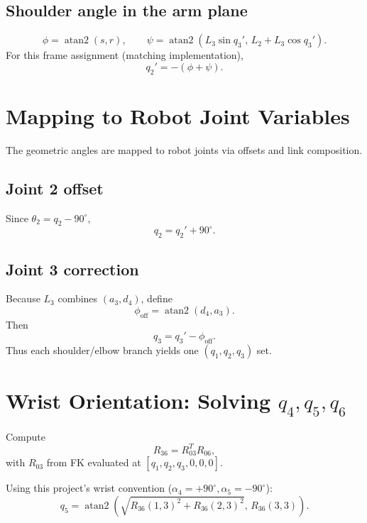 \documentclass[11pt]{article}
\begin{document}
\subsection*{Shoulder angle in the arm plane}
\begin{equation}
    \phi = \operatorname{atan2}(s,r),
    \qquad
    \psi = \operatorname{atan2}(L_3\sin q_3',\,L_2+L_3\cos q_3').
\end{equation}
For this frame assignment (matching implementation),
\begin{equation}
    q_2' = -(\phi+\psi).
\end{equation}

\section{Mapping to Robot Joint Variables}
The geometric angles are mapped to robot joints via offsets and link composition.

\subsection*{Joint 2 offset}
Since $\theta_2=q_2-90^\circ$,
\begin{equation}
    q_2 = q_2' + 90^\circ.
\end{equation}

\subsection*{Joint 3 correction}
Because $L_3$ combines $(a_3,d_4)$, define
\begin{equation}
    \phi_{\mathrm{off}}=\operatorname{atan2}(d_4,a_3).
\end{equation}
Then
\begin{equation}
    q_3 = q_3' - \phi_{\mathrm{off}}.
\end{equation}
Thus each shoulder/elbow branch yields one $(q_1,q_2,q_3)$ set.

\section{Wrist Orientation: Solving $q_4,q_5,q_6$}
Compute
\begin{equation}
    R_{36}=R_{03}^TR_{06},
\end{equation}
with $R_{03}$ from FK evaluated at $[q_1,q_2,q_3,0,0,0]$.

Using this project's wrist convention ($\alpha_4=+90^\circ,\alpha_5=-90^\circ$):
\begin{equation}
    q_5 = \operatorname{atan2}\!\left(\sqrt{R_{36}(1,3)^2+R_{36}(2,3)^2},\,R_{36}(3,3)\right).
\end{equation}
\end{document}
